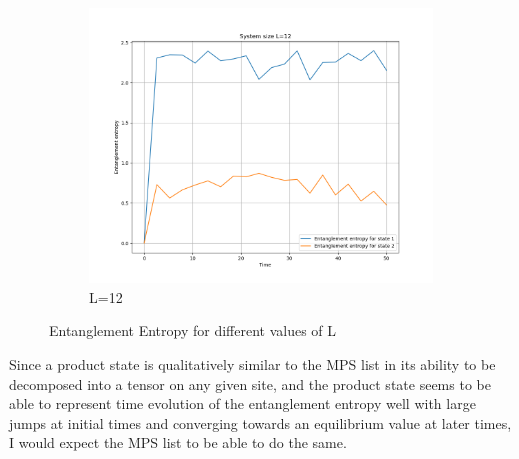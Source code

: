 \documentclass[12pt]{article}
\begin{document}
\begin{figure}[htbp]
    \begin{subfigure}[b]{0.50\textwidth}
        \centering
        \includegraphics[width=\textwidth]{p4_1_3_Entanglement_Entropy_L=12.png}
        \caption{L=12}
        \label{fig:L12}
    \end{subfigure}
    \caption{Entanglement Entropy for different values of L}
    \label{fig:entanglement_entropy}
\end{figure}
Since a product state is qualitatively similar to the MPS list in its ability to be decomposed into a tensor on any given site, and the product state seems to be able to represent time evolution of the entanglement entropy well with large jumps at initial times and converging towards an equilibrium value at later times, I would expect the MPS list to be able to do the same.
\end{document}
